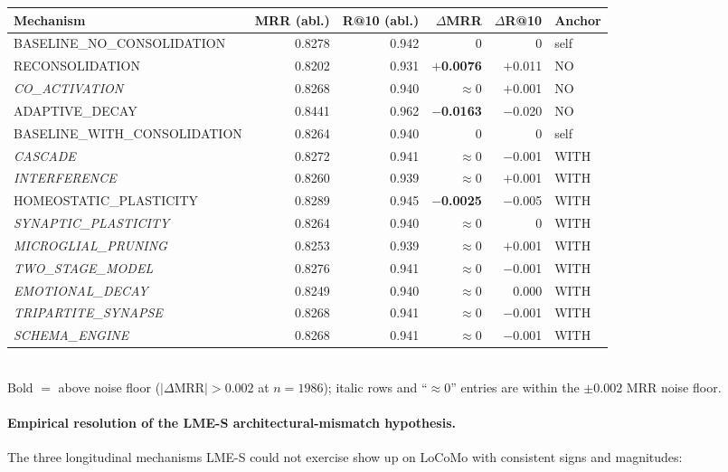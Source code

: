 \documentclass[11pt]{article}
\begin{document}
\begin{center}
\small
\begin{tabular}{lrrrrl}
\toprule
Mechanism                       & MRR (abl.) & R@10 (abl.) & $\Delta$MRR & $\Delta$R@10 & Anchor \\
\midrule
BASELINE\_NO\_CONSOLIDATION     & 0.8278 & 0.942 & 0          & 0          & self \\
RECONSOLIDATION                 & 0.8202 & 0.931 & \textbf{$+$0.0076}  & $+$0.011   & NO   \\
\emph{CO\_ACTIVATION}                  & 0.8268 & 0.940 & $\approx 0$  & $+$0.001   & NO   \\
ADAPTIVE\_DECAY                 & 0.8441 & 0.962 & \textbf{$-$0.0163}  & $-$0.020   & NO   \\
BASELINE\_WITH\_CONSOLIDATION   & 0.8264 & 0.940 & 0          & 0          & self \\
\emph{CASCADE}                         & 0.8272 & 0.941 & $\approx 0$  & $-$0.001   & WITH \\
\emph{INTERFERENCE}                    & 0.8260 & 0.939 & $\approx 0$  & $+$0.001   & WITH \\
HOMEOSTATIC\_PLASTICITY         & 0.8289 & 0.945 & \textbf{$-$0.0025}  & $-$0.005   & WITH \\
\emph{SYNAPTIC\_PLASTICITY}            & 0.8264 & 0.940 & $\approx 0$ & 0 & WITH \\
\emph{MICROGLIAL\_PRUNING}             & 0.8253 & 0.939 & $\approx 0$  & $+$0.001   & WITH \\
\emph{TWO\_STAGE\_MODEL}               & 0.8276 & 0.941 & $\approx 0$  & $-$0.001   & WITH \\
\emph{EMOTIONAL\_DECAY}                & 0.8249 & 0.940 & $\approx 0$ & $\phantom{-}0.000$ & WITH \\
\emph{TRIPARTITE\_SYNAPSE}             & 0.8268 & 0.941 & $\approx 0$  & $-$0.001   & WITH \\
\emph{SCHEMA\_ENGINE}                  & 0.8268 & 0.941 & $\approx 0$  & $-$0.001   & WITH \\
\bottomrule
\end{tabular}\\[2pt]
{\footnotesize Bold $=$ above noise floor ($|\Delta\text{MRR}| >
0.002$ at $n{=}1986$); italic rows and ``$\approx 0$'' entries are
within the $\pm 0.002$ MRR noise floor.}
\end{center}

\paragraph{Empirical resolution of the LME-S architectural-mismatch
hypothesis.}  The three longitudinal mechanisms LME-S could not
exercise show up on LoCoMo with consistent signs and magnitudes:
\end{document}
